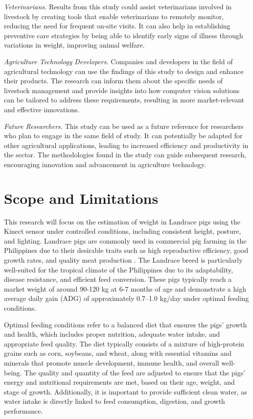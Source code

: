 {\textit{Veterinarians.} Results from this study could assist veterinarians involved in livestock by creating tools that enable veterinarians to remotely monitor, reducing the need for frequent on-site visits. It can also help in establishing preventive care strategies by being able to identify early signs of illness through variations in weight, improving animal welfare.

\textit{Agriculture Technology Developers.} Companies and developers in the field of agricultural technology can use the findings of this study to design and enhance their products. The research can inform them about the specific needs of livestock management and provide insights into how computer vision solutions can be tailored to address these requirements, resulting in more market-relevant and effective innovations.

\textit{Future Researchers.} This study can be used as a future reference for researchers who plan to engage in the same field of study. It can potentially be adapted for other agricultural applications, leading to increased efficiency and productivity in the sector. The methodologies found in the study can guide subsequent research, encouraging innovation and advancement in agriculture technology.

\section{Scope and Limitations}

This research will focus on the estimation of weight in Landrace pigs using the Kinect sensor under controlled conditions, including consistent height, posture, and lighting. Landrace pigs are commonly used in commercial pig farming in the Philippines due to their desirable traits such as high reproductive efficiency, good growth rates, and quality meat production \citep{Manez2020}. The Landrace breed is particularly well-suited for the tropical climate of the Philippines due to its adaptability, disease resistance, and efficient feed conversion. These pigs typically reach a market weight of around 90-120 kg at 6-7 months of age and demonstrate a high average daily gain (ADG) of approximately 0.7–1.0 kg/day under optimal feeding conditions.

Optimal feeding conditions refer to a balanced diet that ensures the pigs’ growth and health, which includes proper nutrition, adequate water intake, and appropriate feed quality. The diet typically consists of a mixture of high-protein grains such as corn, soybeans, and wheat, along with essential vitamins and minerals that promote muscle development, immune health, and overall well-being. The quality and quantity of the feed are adjusted to ensure that the pigs' energy and nutritional requirements are met, based on their age, weight, and stage of growth. Additionally, it is important to provide sufficient clean water, as water intake is directly linked to feed consumption, digestion, and growth performance.

}
